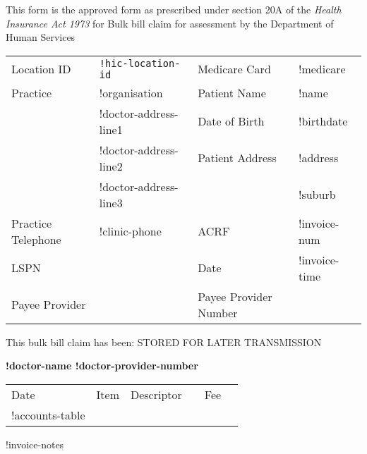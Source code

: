 \documentclass[12pt]{article}
\begin{document}
 \raisebox{1.5ex}{MEDICARE - ONLINE CLAIMING BULK BILL ASSIGNMENT OF BENEFIT FORM}

\vspace{3mm}

\begin{spacing}{0.3}

{\tiny This form is the approved form as prescribed under section 20A of the \emph{Health Insurance Act 1973} for Bulk bill claim for assessment by the Department of Human Services }

\end{spacing}

\vspace{8mm}

\begin{tabular}{llll}
  Location ID & \texttt{!hic-location-id} & Medicare Card & !medicare \\
  Practice & !organisation & Patient Name & !name \\
  & !doctor-address-line1 & Date of Birth & !birthdate \\
  & !doctor-address-line2 &  Patient Address & !address \\
  & !doctor-address-line3 & & !suburb \\
 Practice Telephone & !clinic-phone & ACRF & !invoice-num \\
LSPN & & Date & !invoice-time \\
Payee Provider & & Payee Provider Number & \\
\end{tabular}

\vspace{3mm}

This bulk bill claim has been: STORED FOR LATER TRANSMISSION

\vspace{3mm}

{\bf !doctor-name !doctor-provider-number}

\vspace{3mm}

\begin{tabularx}{\textwidth}{llp{70mm}rrr}
Date & Item & Descriptor & & Fee & \\ \cmidrule(l){1-6}
!accounts-table
\end{tabularx}

!invoice-notes

\vspace{3mm}
\end{document}
